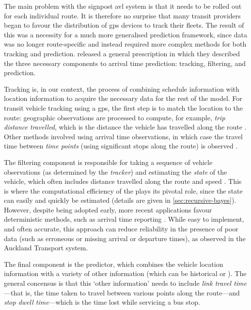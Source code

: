 The main problem with the signpost \gls{avl} system is that it needs to be rolled out for each individual route. It is therefore no surprise that many transit providers began to favour the distribution of \gls{gps} devices to track their fleets. The result of this was a necessity for a much more generalised prediction framework, since data was no longer route-specific and instead required more complex methods for both tracking and prediction. \citet{Cathey_2003} released a general prescription in which they described the three necessary components to arrival time prediction: tracking, filtering, and prediction.


Tracking is, in our context, the process of combining schedule information with \rt{} location information to acquire the necessary data for the rest of the model. For transit vehicle tracking using a \gls{gps}, the first step is to match the location to the route: geographic observations are processed to compute, for example, \emph{trip distance travelled}, which is the distance the vehicle has travelled along the route \citep{Cathey_2003,Gong_2013}. Other methods involved using arrival time observations, in which case the travel time between \emph{time points} (using significant stops along the route) is observed \citep{Shalaby_2004,Jeong_2005,Yu_2011}.


The filtering component is responsible for taking a sequence of vehicle observations (as determined by the \emph{tracker}) and estimating the \emph{state} of the vehicle, which often includes distance travelled along the route and speed \citep{Dailey_2001,Cathey_2003}. This is where the computational efficiency of the \kf{} plays its pivotal role, since the state can easily and quickly be estimated (details are given in \cref{sec:recursive-bayes}). However, despite being adopted early, more recent applications favour deterministic methods, such as arrival time reporting \citep{Yin_2017,Cats_2015,Cats_2016}. While easy to implement, and often accurate, this approach can reduce reliability in the presence of poor data (such as erroneous or missing arrival or departure times), as observed in the Auckland Transport system.


The final component is the predictor, which combines the vehicle location information with a variety of other information (which can be historical or \rt{}). The general concensus is that this `other information' needs to include \emph{link travel time}---that is, the time taken to travel between various points along the route---and \emph{stop dwell time}---which is the time lost while servicing a bus stop.



